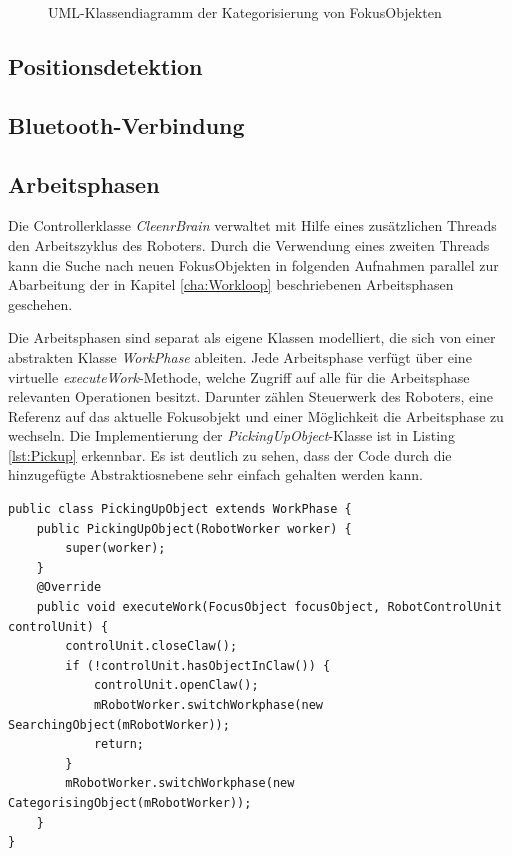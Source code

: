 \begin{figure}[h]
\centering
\caption{UML-Klassendiagramm der Kategorisierung von FokusObjekten}
\label{fig:UMLFocus}
\end{figure}

\subsection{Positionsdetektion}

\subsection{Bluetooth-Verbindung}

\subsection{Arbeitsphasen}

Die Controllerklasse \textit{CleenrBrain} verwaltet mit Hilfe eines zusätzlichen Threads den Arbeitszyklus des Roboters. Durch die Verwendung eines zweiten Threads kann die Suche nach neuen FokusObjekten in folgenden Aufnahmen parallel zur Abarbeitung der in Kapitel \ref{cha:Workloop} beschriebenen Arbeitsphasen geschehen. 

Die Arbeitsphasen sind separat als eigene Klassen modelliert, die sich von einer abstrakten Klasse \textit{WorkPhase} ableiten. Jede Arbeitsphase verfügt über eine virtuelle \textit{executeWork}-Methode, welche Zugriff auf alle für die Arbeitsphase relevanten Operationen besitzt. Darunter zählen Steuerwerk des Roboters, eine Referenz auf das aktuelle Fokusobjekt und einer Möglichkeit die Arbeitsphase zu wechseln. Die Implementierung der \textit{PickingUpObject}-Klasse ist in Listing \ref{lst:Pickup} erkennbar. Es ist deutlich zu sehen, dass der Code durch die hinzugefügte Abstraktiosnebene sehr einfach gehalten werden kann.

\begin{lstlisting}[caption={Implementierung der Arbeitsphase \glqq Gegenstand aufnehmen\grqq }, label=lst:Pickup]
public class PickingUpObject extends WorkPhase {
    public PickingUpObject(RobotWorker worker) {
        super(worker);
    }
    @Override
    public void executeWork(FocusObject focusObject, RobotControlUnit controlUnit) {
        controlUnit.closeClaw();
        if (!controlUnit.hasObjectInClaw()) {
            controlUnit.openClaw();
            mRobotWorker.switchWorkphase(new SearchingObject(mRobotWorker));
            return;
        }
        mRobotWorker.switchWorkphase(new CategorisingObject(mRobotWorker));
    }
}
\end{lstlisting}

